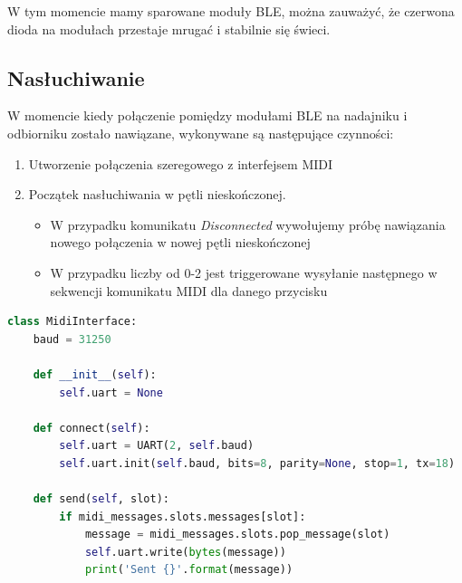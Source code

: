 \documentclass[eng,printmode]{mgr}
\begin{document}
W tym momencie mamy sparowane moduły BLE, można zauważyć, że czerwona dioda na modułach przestaje mrugać i stabilnie się świeci.

\newpage
\subsection{Nasłuchiwanie}

W momencie kiedy połączenie pomiędzy modułami BLE na nadajniku i odbiorniku zostało nawiązane, wykonywane są następujące czynności:

\begin{enumerate}
\item Utworzenie połączenia szeregowego z interfejsem MIDI
\item Początek nasłuchiwania w pętli nieskończonej.
\begin{itemize}
\item W przypadku komunikatu \textit{Disconnected} wywołujemy próbę nawiązania nowego połączenia w nowej pętli nieskończonej
\item W przypadku liczby od 0-2 jest triggerowane wysyłanie następnego w sekwencji komunikatu MIDI dla danego przycisku
\end{itemize}
\end{enumerate}


\begin{lstlisting}[language=Python]
class MidiInterface:
    baud = 31250

    def __init__(self):
        self.uart = None

    def connect(self):
        self.uart = UART(2, self.baud)
        self.uart.init(self.baud, bits=8, parity=None, stop=1, tx=18)

    def send(self, slot):
        if midi_messages.slots.messages[slot]:
            message = midi_messages.slots.pop_message(slot)
            self.uart.write(bytes(message))
            print('Sent {}'.format(message))
\end{lstlisting}
\end{document}

